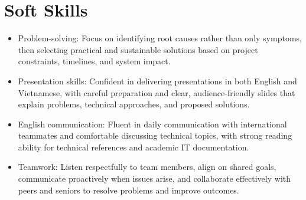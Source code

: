 \section{Soft Skills}
\begin{itemize}
  \item Problem-solving: Focus on identifying root causes rather than only symptoms, then selecting practical and sustainable solutions based on project constraints, timelines, and system impact.
  \item Presentation skills: Confident in delivering presentations in both English and Vietnamese, with careful preparation and clear, audience-friendly slides that explain problems, technical approaches, and proposed solutions.
  \item English communication: Fluent in daily communication with international teammates and comfortable discussing technical topics, with strong reading ability for technical references and academic IT documentation.
  \item Teamwork: Listen respectfully to team members, align on shared goals, communicate proactively when issues arise, and collaborate effectively with peers and seniors to resolve problems and improve outcomes.
\end{itemize}
